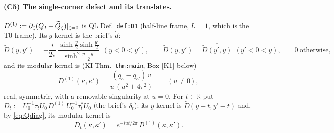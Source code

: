 \documentclass[11pt]{article}
\theoremstyle{definition}\newtheorem{hypothesis}[theorem]{Hypothesis}
\begin{document}
\paragraph{(C5) The single-corner defect and its translates.}
$D^{(1)}:=\partial_\zeta(Q_I-\widetilde Q_\zeta)|_{\zeta=0}$ is QL Def.~\texttt{def:D1} (half-line frame, $L=1$, which
is the T0 frame).  Its $y$-kernel is the brief's $\dot d$:
\begin{equation}\label{eq:ddot}
 \widetilde D(y,y')=-\frac i{2\pi}\,\frac{\sinh\frac y2\sinh\frac{y'}2}{\sinh^2\frac{y-y'}2}
 \ \ (y<0<y'),\qquad \widetilde D(y,y')=\overline{\widetilde D(y',y)}\ \ (y'<0<y),\qquad 0\ \text{otherwise},
\end{equation}
and its modular kernel is (KI Thm.~\texttt{thm:main}, Box [K1] below)
\begin{equation}\label{eq:KI}
 D^{(1)}(\kappa,\kappa')=\frac{(q_\kappa-q_{\kappa'})\,v}{u\,(u^2+4\pi^2)}\qquad(u\neq0),
\end{equation}
real, symmetric, with a removable singularity at $u=0$.  For $t\in\mathbb R$ put
$D_t:=U_0^{-1}\tau_tU_0\,D^{(1)}\,U_0^{-1}\tau_t^*U_0$ (the brief's $\delta_t$): its $y$-kernel is
$\widetilde D(y-t,y'-t)$ and, by \eqref{eq:Qdiag}, its modular kernel is
\begin{equation}\label{eq:Dt}
 D_t(\kappa,\kappa')=e^{-iut/2\pi}\,D^{(1)}(\kappa,\kappa') .
\end{equation}
\end{document}
